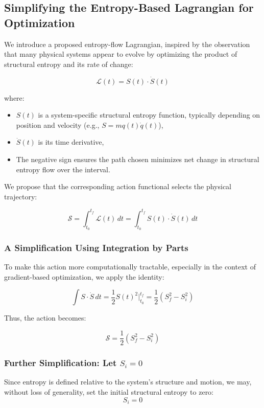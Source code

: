 \documentclass[12pt]{article}
\begin{document}
\subsection{Simplifying the Entropy-Based Lagrangian for Optimization}

We introduce a proposed entropy-flow Lagrangian, inspired by the observation that many physical systems appear to evolve by optimizing the product of structural entropy and its rate of change:

\[
\mathcal{L}(t) = S(t) \cdot \dot{S}(t)
\]

where:
\begin{itemize}
    \item \(S(t)\) is a system-specific structural entropy function, typically depending on position and velocity (e.g., \(S = m q(t) \dot{q}(t)\)),
    \item \(\dot{S}(t)\) is its time derivative,
    \item The negative sign ensures the path chosen minimizes net change in structural entropy flow over the interval.
\end{itemize}

We propose that the corresponding action functional selects the physical trajectory:

\[
\mathcal{S} = \int_{t_0}^{t_f} \mathcal{L}(t) \, dt = \int_{t_0}^{t_f} S(t) \cdot \dot{S}(t) \, dt
\]

\subsubsection{A Simplification Using Integration by Parts}

To make this action more computationally tractable, especially in the context of gradient-based optimization, we apply the identity:

\[
\int S \cdot \dot{S} \, dt = \frac{1}{2} S(t)^2 \Big|_{t_0}^{t_f} = \frac{1}{2} \left(S_f^2 - S_i^2\right)
\]

Thus, the action becomes:

\[
\mathcal{S} = \frac{1}{2} \left(S_f^2 - S_i^2\right)
\]

\subsubsection{Further Simplification: Let $S_i=0$}

Since entropy is defined relative to the system’s structure and motion, we may, without loss of generality, set the initial structural entropy to zero:
\[
S_i = 0
\]
\end{document}
